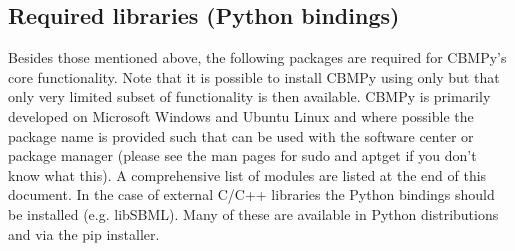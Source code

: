 \documentclass[letterpaper,10pt,english]{sphinxmanual}
\begin{document}
\begin{sphinxVerbatim}[commandchars=\\\{\}]
       
      
   
\end{sphinxVerbatim}


\subsection{Required libraries (Python bindings)}
\label{\detokenize{install_doc:required-libraries-python-bindings}}
\sphinxAtStartPar
Besides those mentioned above, the following packages are required for CBMPy’s
core functionality. Note that it is possible to install CBMPy using only
 but that only very limited subset of functionality is then available.
CBMPy is primarily developed on Microsoft Windows and Ubuntu Linux and where possible the package
name is provided such that can be used with the software center or package manager
 (please see the man pages for sudo and apt\sphinxhyphen{}get
if you don’t know what this). A comprehensive list of modules are listed at the end of this
document. In the case of external C/C++ libraries the Python bindings should be installed (e.g. libSBML). Many
of these are available in  Python distributions and via the pip installer.
\end{document}
